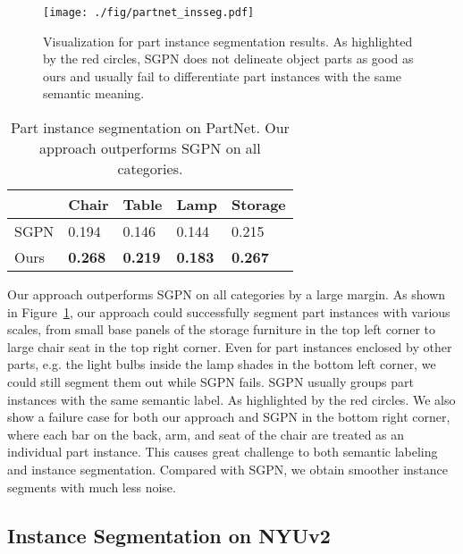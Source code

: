 \documentclass[10pt,twocolumn,letterpaper]{article}
\begin{document}
\begin{figure}
    \centering
    \texttt{[image: ./fig/partnet\_insseg.pdf]}
    \caption{Visualization for part instance segmentation results. As highlighted by the red circles, SGPN does not delineate object parts as good as ours and usually fail to differentiate part instances with the same semantic meaning.}
    \label{fig:partnet_insseg}
\vspace{-1.5\baselineskip}
\end{figure}


\begin{table}[h]
\vspace{-0.5\baselineskip}
\centering
{}
{
\setlength{\tabcolsep}{0.2em}
\renewcommand{\arraystretch}{0.9}
\begin{tabularx}{\columnwidth}{Y|Y|Y|Y|Y}
\toprule
    & Chair & Table & Lamp & Storage\\
    \hline
   SGPN & 0.194 & 0.146 & 0.144 & 0.215 \\
   Ours & \textbf{0.268} & \textbf{0.219} & \textbf{0.183} & \textbf{0.267} \\
\bottomrule
\end{tabularx}
}
\caption{Part instance segmentation on PartNet. Our approach outperforms SGPN on all categories.}
\label{tab:partnet_insseg}
\vspace{-0.5\baselineskip}
\end{table}


Our approach outperforms SGPN on all categories by a large margin. As shown in Figure~\ref{fig:partnet_insseg}, our approach could successfully segment part instances with various scales, from small base panels of the storage furniture in the top left corner to large chair seat in the top right corner. Even for part instances enclosed by other parts, e.g. the light bulbs inside the lamp shades in the bottom left corner, we could still segment them out while SGPN fails. SGPN usually groups part instances with the same semantic label. As highlighted by the red circles. We also show a failure case for both our approach and SGPN in the bottom right corner, where each bar on the back, arm, and seat of the chair are treated as an individual part instance. This causes great challenge to both semantic labeling and instance segmentation. Compared with SGPN, we obtain smoother instance segments with much less noise.

\subsection{Instance Segmentation on NYUv2}
\end{document}
